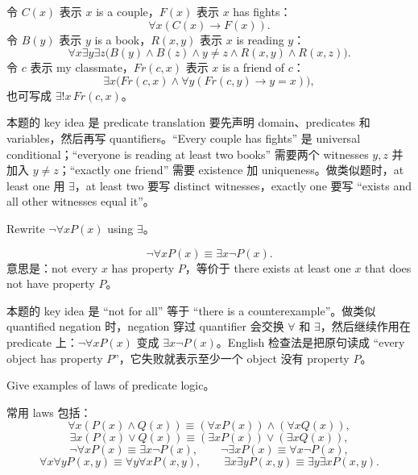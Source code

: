 \begin{solution}
令 \(C(x)\) 表示 \(x\) is a couple，\(F(x)\) 表示 \(x\) has fights：
\[
\forall x(C(x)\to F(x)).
\]
令 \(B(y)\) 表示 \(y\) is a book，\(R(x,y)\) 表示 \(x\) is reading \(y\)：
\[
\forall x\exists y\exists z\bigl(B(y)\land B(z)\land y\ne z\land R(x,y)\land R(x,z)\bigr).
\]
令 \(c\) 表示 my classmate，\(Fr(c,x)\) 表示 \(x\) is a friend of \(c\)：
\[
\exists x\bigl(Fr(c,x)\land\forall y(Fr(c,y)\to y=x)\bigr),
\]
也可写成 \(\exists!x\,Fr(c,x)\)。
\end{solution}

\begin{explanation}
本题的 key idea 是 predicate translation 要先声明 domain、predicates 和 variables，然后再写 quantifiers。``Every couple has fights'' 是 universal conditional；``everyone is reading at least two books'' 需要两个 witnesses \(y,z\) 并加入 \(y\ne z\)；``exactly one friend'' 需要 existence 加 uniqueness。做类似题时，at least one 用 \(\exists\)，at least two 要写 distinct witnesses，exactly one 要写 ``exists and all other witnesses equal it''。
\end{explanation}

\begin{exerciseblock}
Rewrite \(\lnot\forall xP(x)\) using \(\exists\)。
\end{exerciseblock}

\begin{solution}
\[
\lnot\forall xP(x)\equiv\exists x\lnot P(x).
\]
意思是：not every \(x\) has property \(P\)，等价于 there exists at least one \(x\) that does not have property \(P\)。
\end{solution}

\begin{explanation}
本题的 key idea 是 ``not for all'' 等于 ``there is a counterexample''。做类似 quantified negation 时，negation 穿过 quantifier 会交换 \(\forall\) 和 \(\exists\)，然后继续作用在 predicate 上：\(\lnot\forall xP(x)\) 变成 \(\exists x\lnot P(x)\)。English 检查法是把原句读成 ``every object has property \(P\)''，它失败就表示至少一个 object 没有 property \(P\)。
\end{explanation}

\begin{exerciseblock}
Give examples of laws of predicate logic。
\end{exerciseblock}

\begin{solution}
常用 laws 包括：
\[
\forall x(P(x)\land Q(x))\equiv(\forall xP(x))\land(\forall xQ(x)),
\]
\[
\exists x(P(x)\lor Q(x))\equiv(\exists xP(x))\lor(\exists xQ(x)),
\]
\[
\lnot\forall xP(x)\equiv\exists x\lnot P(x),\qquad
\lnot\exists xP(x)\equiv\forall x\lnot P(x),
\]
\[
\forall x\forall yP(x,y)\equiv\forall y\forall xP(x,y),\qquad
\exists x\exists yP(x,y)\equiv\exists y\exists xP(x,y).
\]
\end{solution}

